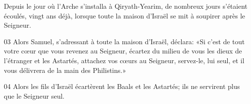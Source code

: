 Depuis le jour où l’Arche s’installa à Qiryath-Yearim, de nombreux jours s’étaient écoulés, vingt ans déjà, lorsque toute la maison d’Israël se mit à soupirer après le Seigneur.

03 Alors Samuel, s’adressant à toute la maison d’Israël, déclara: «Si c’est de tout votre cœur que vous revenez au Seigneur, écartez du milieu de vous les dieux de l’étranger et les Astartés, attachez vos cœurs au Seigneur, servez-le, lui seul, et il vous délivrera de la main des Philistins.»

04 Alors les fils d’Israël écartèrent les Baals et les Astartés; ils ne servirent plus que le Seigneur seul.
